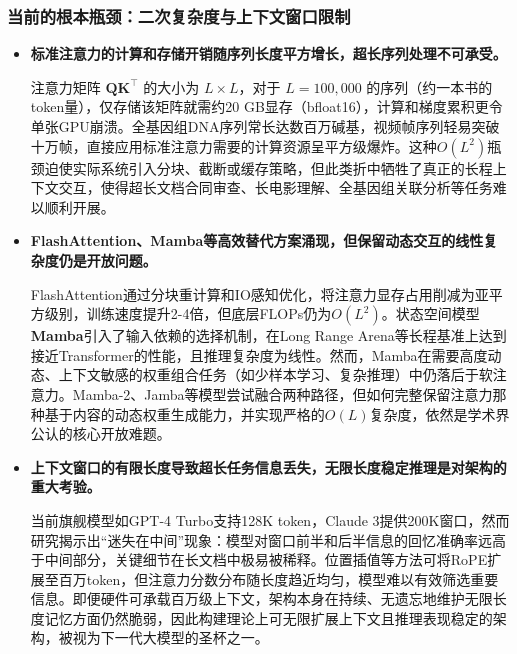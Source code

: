 \documentclass[11pt]{beamer}
\begin{document}
\begin{frame}
\frametitle{当前的根本瓶颈：二次复杂度与上下文窗口限制}

\begin{itemize}
  \item \textbf{标准注意力的计算和存储开销随序列长度平方增长，超长序列处理不可承受。}
  
  注意力矩阵 $\mathbf{Q}\mathbf{K}^\top$ 的大小为 $L \times L$，对于 $L = 100,000$ 的序列（约一本书的token量），仅存储该矩阵就需约20 GB显存（bfloat16），计算和梯度累积更令单张GPU崩溃。全基因组DNA序列常长达数百万碱基，视频帧序列轻易突破十万帧，直接应用标准注意力需要的计算资源呈\alert{平方级爆炸}。这种$O(L^2)$瓶颈迫使实际系统引入分块、截断或缓存策略，但此类折中牺牲了真正的长程上下文交互，使得超长文档合同审查、长电影理解、全基因组关联分析等任务难以顺利开展。

  \item \textbf{FlashAttention、Mamba等高效替代方案涌现，但保留动态交互的线性复杂度仍是开放问题。}
  
  \alert{FlashAttention}通过分块重计算和IO感知优化，将注意力显存占用削减为亚平方级别，训练速度提升2-4倍，但底层FLOPs仍为$O(L^2)$。状态空间模型\textbf{Mamba}引入了输入依赖的选择机制，在Long Range Arena等长程基准上达到接近Transformer的性能，且推理复杂度为线性。然而，Mamba在需要高度动态、上下文敏感的权重组合任务（如少样本学习、复杂推理）中仍落后于软注意力。Mamba-2、Jamba等模型尝试融合两种路径，但如何完整保留注意力那种基于内容的动态权重生成能力，并实现严格的$O(L)$复杂度，依然是学术界公认的核心\alert{开放难题}。

  \item \textbf{上下文窗口的有限长度导致超长任务信息丢失，无限长度稳定推理是对架构的重大考验。}
  
  当前旗舰模型如GPT-4 Turbo支持128K token，Claude 3提供200K窗口，然而研究揭示出\alert{“迷失在中间”}现象：模型对窗口前半和后半信息的回忆准确率远高于中间部分，关键细节在长文档中极易被稀释。位置插值等方法可将RoPE扩展至百万token，但注意力分数分布随长度趋近均匀，模型难以有效筛选重要信息。即便硬件可承载百万级上下文，架构本身在持续、无遗忘地维护无限长度记忆方面仍然脆弱，因此构建\alert{理论上可无限扩展上下文}且推理表现稳定的架构，被视为下一代大模型的圣杯之一。
\end{itemize}
\end{frame}
\end{document}
